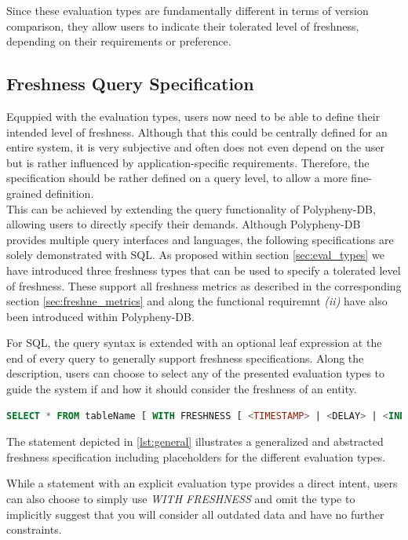 Since these evaluation types are fundamentally different in terms of version comparison, they
allow users to indicate their tolerated level of freshness, depending on their requirements or preference. 



\subsection{Freshness Query Specification}
\label{sec:fresh_spec}

Equppied with the evaluation types, users now need to be able to define their intended level of freshness.
Although that this could be centrally defined for an entire system, it is very subjective and often does not even depend on the user
but is rather influenced by application-specific requirements.
Therefore, the specification should be rather defined on a query level, to allow a more fine-grained definition.\\

This can be achieved by extending the query functionality of Polypheny-DB, allowing users to directly specify their demands.
Although Polypheny-DB provides multiple query interfaces and languages, the following specifications are solely demonstrated with SQL. 
As proposed within section \ref{sec:eval_types} we have introduced three freshness types that can be used to specify a tolerated level of freshness.
These support all freshness metrics as described in the corresponding section \ref{sec:freshne_metrics} and along the functional 
requiremnt \textit{(ii)} have also been introduced within Polypheny-DB.

For SQL, the query syntax is extended  with an optional leaf expression at the end of every query to generally support freshness specifications. 
Along the description, users can choose to select any of the presented evaluation types to guide the system if and how it should consider the freshness of an entity.
\begin{lstlisting}[language=sql, caption={Generalized Freshness Specification},label={lst:general}]
SELECT * FROM tableName [ WITH FRESHNESS [ <TIMESTAMP> | <DELAY> | <INDEX> ] ];
\end{lstlisting}

The statement depicted in \ref{lst:general} illustrates a generalized and abstracted freshness specification including placeholders for the different evaluation types.

While a statement with an explicit evaluation type provides a direct intent, users can also choose to simply use \emph{WITH FRESHNESS} 
and omit the type to implicitly suggest that you will consider all outdated data and have no further constraints.





